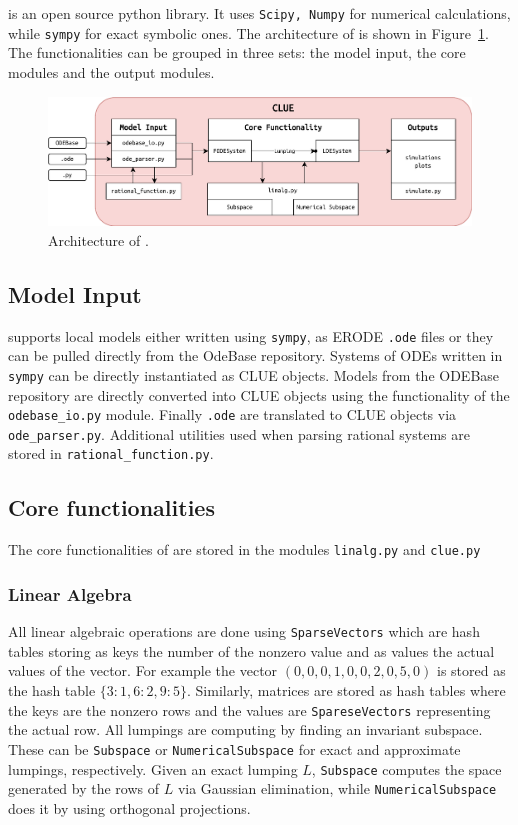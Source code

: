 \ToolName is an open source python library.
It uses \texttt{Scipy, Numpy} for numerical calculations, while \texttt{sympy} for exact symbolic ones.
The architecture of \ToolName is shown in Figure~\ref{fig:clue_arch}.
The functionalities can be grouped in three sets: the model input, the core modules and the output modules.
\begin{figure}
	\centering
	\includegraphics[width=\textwidth]{img/clue.pdf}
	\caption{Architecture of \ToolName.}
	\label{fig:clue_arch}
\end{figure}
\subsection{Model Input}
\ToolName supports local models either written using \texttt{sympy}, as ERODE \texttt{.ode} files or they can be pulled directly from the OdeBase repository.
Systems of ODEs written in \texttt{sympy} can be directly instantiated as CLUE objects.
Models from the ODEBase repository are directly converted into CLUE objects using the functionality of the \texttt{odebase\_io.py} module.
Finally \texttt{.ode} are translated to CLUE objects via \texttt{ode\_parser.py}.
Additional utilities used when parsing rational systems are stored in \texttt{rational\_function.py}.

\subsection{Core functionalities}
The core functionalities of \ToolName are stored in the modules \texttt{linalg.py} and \texttt{clue.py}

\subsubsection{Linear Algebra}
All linear algebraic operations are done using \texttt{SparseVectors} which are hash tables storing as keys the number of the nonzero value and as values the actual values of the vector.
For example the vector $(0,0,0,1,0,0,2,0,5,0)$ is stored as the hash table $\{ 3:1, 6:2, 9:5\}$.
Similarly, matrices are stored as hash tables where the keys are the nonzero rows and the values are \texttt{SpareseVectors} representing the actual row.
All lumpings are computing by finding an invariant subspace.
These can be \texttt{Subspace} or \texttt{NumericalSubspace} for exact and approximate lumpings, respectively.
Given an exact lumping $L$, \texttt{Subspace} computes the space generated by the rows of $L$ via Gaussian elimination, while \texttt{NumericalSubspace} does it by using orthogonal projections.

